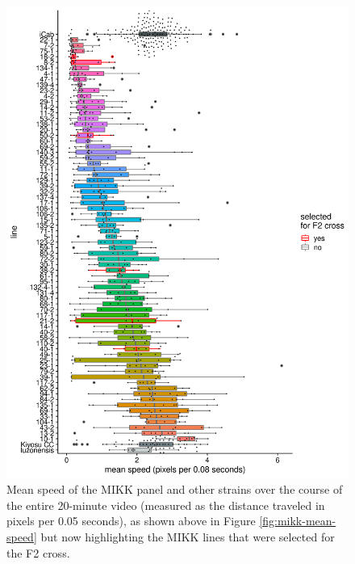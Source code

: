 \documentclass[
]{book}
\begin{document}
\begin{figure}
\includegraphics[width=1\linewidth]{figs/mikk_behaviour/line_mean_speed_0.05_selected} \caption{Mean speed of the MIKK panel and other strains over the course of the entire 20-minute video (measured as the distance traveled in pixels per 0.05 seconds), as shown above in Figure \ref{fig:mikk-mean-speed} but now highlighting the MIKK lines that were selected for the F2 cross.}\label{fig:F0-line-mean-speed-select}
\end{figure}
\end{document}
